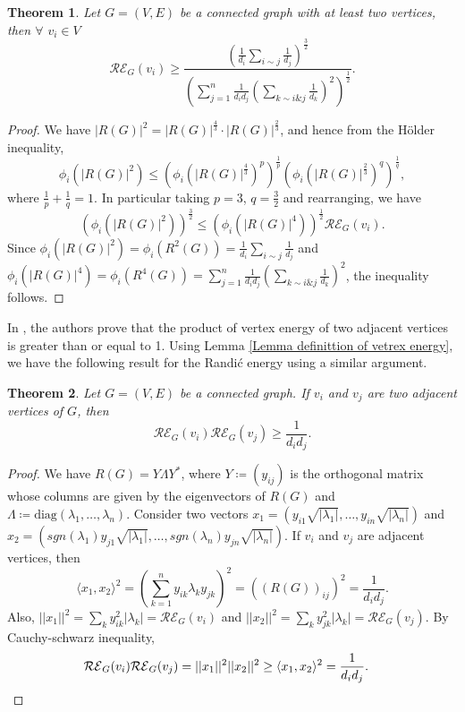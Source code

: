 \documentclass[10 pt]{article}
\newtheorem{theorem}{Theorem}[section]
\numberwithin{equation}{section}
\begin{document}
\begin{theorem}
Let $G=(V,E)$ be a connected graph with at least two vertices, then $\forall$ $v_i\in V$
$$\mathcal{RE}_G(v_i)\geq\frac{\left(\frac{1}{d_i}\sum\limits_{i\sim j}\frac{1}{d_j}\right)^{\frac{3}{2}}}{\left(\sum\limits_{j=1}^n\frac{1}{d_id_j}\left(\sum\limits_{k\sim i \& j}\frac{1}{d_k}\right)^2\right)^{\frac{1}{2}}}.$$
\end{theorem}
\begin{proof}
We have $|R(G)|^2=|R(G)|^{\frac{4}{3}}\cdot|R(G)|^{\frac{2}{3}}$, and hence from the H\"{o}lder inequality,
$$\phi_i(|R(G)|^2)\leq \left(\phi_i\left(|R(G)|^{\frac{4}{3}}\right)^p \right)^{\frac{1}{p}} \left(\phi_i\left(|R(G)|^{\frac{2}{3}}\right)^q \right)^{\frac{1}{q}},$$
where $\frac{1}{p}+\frac{1}{q}=1$. In particular taking $p=3$, $q=\frac{3}{2}$ and rearranging, we have
$$\left(\phi_i(|R(G)|^2)\right)^\frac{3}{2}\leq \left(\phi_i\left(|R(G)|^4\right) \right)^{\frac{1}{2}} \mathcal{RE}_G(v_i).$$
Since $\phi_i(|R(G)|^2)=\phi_i(R^2(G))=\frac{1}{d_i}\sum\limits_{i\sim j}\frac{1}{d_j}$ and $\phi_i(|R(G)|^4)=\phi_i(R^4(G))=\sum\limits_{j=1}^n\frac{1}{d_id_j}\left(\sum\limits_{k\sim i \& j}\frac{1}{d_k}\right)^2$, the inequality follows.
\end{proof}



In \cite{Arizmendi2021}, the authors prove that the product of vertex energy of two adjacent vertices is greater than or equal to 1. Using Lemma \ref{Lemma definittion of vetrex energy}, we have the following result for the Randi\'c energy using a similar argument.

\begin{theorem}
Let $G=(V,E)$ be a connected graph. If $v_i$ and $v_j$ are two adjacent vertices of $G$, then
$$\mathcal{RE}_G(v_i)\mathcal{RE}_G(v_j)\geq\frac{1}{d_id_j}.$$
\end{theorem}
\begin{proof}
We have $R(G)=Y\Lambda Y^*$, where $Y \coloneqq(y_{ij})$ is the orthogonal matrix whose columns are given by the eigenvectors of $R(G)$ and $\Lambda\coloneqq \text{diag}\left(\lambda_1,\ldots,\lambda_n\right)$. Consider two vectors $x_1=(y_{i1}\sqrt{|\lambda_1|},\ldots,y_{in}\sqrt{|\lambda_n|})$ and $x_2=(sgn(\lambda_1)y_{j1}\sqrt{|\lambda_1|},\ldots,sgn(\lambda_n)y_{jn}\sqrt{|\lambda_n|})$. If $v_i$ and $v_j$ are adjacent vertices, then
$$\langle x_1,x_2\rangle^2=\left(\sum\limits_{k=1}^ny_{ik}\lambda_ky_{jk}\right)^2=\left((R(G))_{ij}\right)^2=\frac{1}{d_id_j}.$$
Also, $||x_1||^2=\sum\limits_{k}y^{2}_{ik}|\lambda_k|=\mathcal{RE}_G(v_i)$ and $||x_2||^2=\sum\limits_{k}y^{2}_{jk}|\lambda_k|=\mathcal{RE}_G(v_j)$. By Cauchy-schwarz inequality,
\begin{align*}
&\mathcal{RE}_G(v_i)\mathcal{RE}_G(v_j)=||x_1||^2||x_2||^2\geq\langle x_1,x_2\rangle^2=\frac{1}{d_id_j}.\qedhere
\end{align*}
\end{proof}
\end{document}
